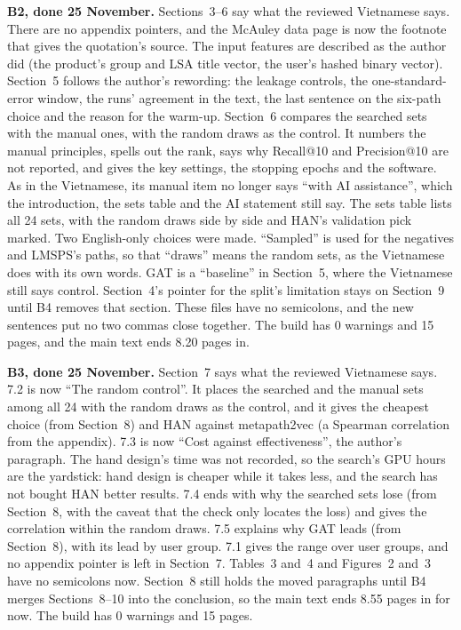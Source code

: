 \documentclass[11pt,a4paper]{article}
\begin{document}
\textbf{B2, done 25 November.} Sections~3--6 say what the reviewed Vietnamese says. There are no
appendix pointers, and the McAuley data page is now the footnote that gives the quotation's source.
The input features are described as the author did (the product's group and LSA title vector, the
user's hashed binary vector). Section~5 follows the author's rewording: the leakage controls, the
one-standard-error window, the runs' agreement in the text, the last sentence on the six-path
choice and the reason for the warm-up. Section~6 compares the searched sets with the manual ones,
with the random draws as the control. It numbers the manual principles, spells out the rank, says
why Recall@10 and Precision@10 are not reported, and gives the key settings, the stopping epochs
and the software. As in the Vietnamese, its manual item no longer says ``with AI assistance'',
which the introduction, the sets table and the AI statement still say. The sets table lists all 24
sets, with the random draws side by side and HAN's validation pick marked. Two English-only choices
were made. ``Sampled'' is used for the negatives and LMSPS's paths, so that ``draws'' means the
random sets, as the Vietnamese does with its own words. GAT is a ``baseline'' in Section~5, where
the Vietnamese still says control. Section~4's pointer for the split's limitation stays on
Section~9 until B4 removes that section. These files have no semicolons, and the new sentences put
no two commas close together. The build has 0 warnings and 15 pages, and the main text ends 8.20
pages in.

\textbf{B3, done 25 November.} Section~7 says what the reviewed Vietnamese says. 7.2 is now ``The
random control''. It places the searched and the manual sets among all 24 with the random draws as
the control, and it gives the cheapest choice (from Section~8) and HAN against metapath2vec (a
Spearman correlation from the appendix). 7.3 is now ``Cost against effectiveness'', the author's
paragraph. The hand design's time was not recorded, so the search's GPU hours are the yardstick:
hand design is cheaper while it takes less, and the search has not bought HAN better results. 7.4
ends with why the searched sets lose (from Section~8, with the caveat that the check only locates
the loss) and gives the correlation within the random draws. 7.5 explains why GAT leads (from
Section~8), with its lead by user group. 7.1 gives the range over user groups, and no appendix
pointer is left in Section~7. Tables~3 and~4 and Figures~2 and~3 have no semicolons now. Section~8
still holds the moved paragraphs until B4 merges Sections~8--10 into the conclusion, so the main
text ends 8.55 pages in for now. The build has 0 warnings and 15 pages.
\end{document}
